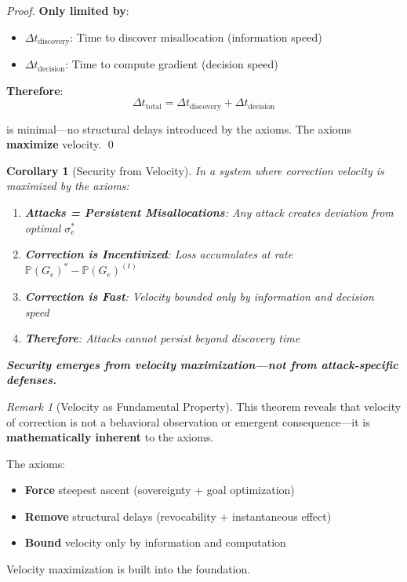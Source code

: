 \documentclass[11pt,a4paper]{article}
\newtheorem{corollary}[theorem]{Corollary}
\theoremstyle{definition}
\theoremstyle{remark}
\newtheorem{remark}[theorem]{Remark}
\begin{document}
\begin{proof}
\textbf{Only limited by}:
\begin{itemize}
\item $\Delta t_{\text{discovery}}$: Time to discover misallocation (information speed)
\item $\Delta t_{\text{decision}}$: Time to compute gradient (decision speed)
\end{itemize}

\textbf{Therefore}:
\[ \Delta t_{\text{total}} = \Delta t_{\text{discovery}} + \Delta t_{\text{decision}} \]

is minimal—no structural delays introduced by the axioms. The axioms \textbf{maximize} velocity. \qed
\end{proof}

\begin{corollary}[Security from Velocity]
\label{cor:security-from-velocity}
In a system where correction velocity is maximized by the axioms:
\begin{enumerate}
\item \textbf{Attacks = Persistent Misallocations}: Any attack creates deviation from optimal $\sigma_e^*$
\item \textbf{Correction is Incentivized}: Loss accumulates at rate $\mathbb{P}(G_e)^* - \mathbb{P}(G_e)^{(t)}$
\item \textbf{Correction is Fast}: Velocity bounded only by information and decision speed
\item \textbf{Therefore}: Attacks cannot persist beyond discovery time
\end{enumerate}

\textbf{Security emerges from velocity maximization—not from attack-specific defenses.}
\end{corollary}

\begin{remark}[Velocity as Fundamental Property]
This theorem reveals that velocity of correction is not a behavioral observation or emergent consequence—it is \textbf{mathematically inherent} to the axioms.

The axioms:
\begin{itemize}
\item \textbf{Force} steepest ascent (sovereignty + goal optimization)
\item \textbf{Remove} structural delays (revocability + instantaneous effect)
\item \textbf{Bound} velocity only by information and computation
\end{itemize}

Velocity maximization is built into the foundation.
\end{remark}
\end{document}
